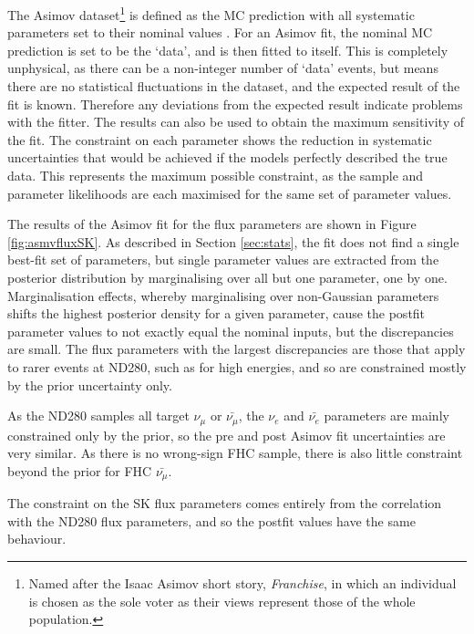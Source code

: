 The Asimov dataset\footnote{Named after the Isaac Asimov short story, \textit{Franchise}, in which an individual is chosen as the sole voter as their views represent those of the whole population.} is defined as the MC prediction with all systematic parameters set to their nominal values \cite{Cowan_2011}. For an Asimov fit, the nominal MC prediction is set to be the `data', and is then fitted to itself. This is completely unphysical, as there can be a non-integer number of `data' events, but means there are no statistical fluctuations in the dataset, and the expected result of the fit is known. Therefore any deviations from the expected result indicate problems with the fitter. The results can also be used to obtain the maximum sensitivity of the fit. The constraint on each parameter shows the reduction in systematic uncertainties that would be achieved if the models perfectly described the true data. This represents the maximum possible constraint, as the sample and parameter likelihoods are each maximised for the same set of parameter values.

The results of the Asimov fit for the flux parameters are shown in Figure \ref{fig:asmvfluxSK}. As described in Section \ref{sec:stats}, the fit does not find a single best-fit set of parameters, but single parameter values are extracted from the posterior distribution by marginalising over all but one parameter, one by one. Marginalisation effects, whereby marginalising over non-Gaussian parameters shifts the highest posterior density for a given parameter, cause the postfit parameter values to not exactly equal the nominal inputs, but the discrepancies are small. The flux parameters with the largest discrepancies are those that apply to rarer events at ND280, such as for high energies, and so are constrained mostly by the prior uncertainty only.

As the ND280 samples all target $\nu_{\mu}$ or $\bar{\nu_{\mu}}$, the $\nu_e$ and $\bar{\nu_e}$ parameters are mainly constrained only by the prior, so the pre and post Asimov fit uncertainties are very similar. As there is no wrong-sign FHC sample, there is also little constraint beyond the prior for FHC $\bar{\nu_{\mu}}$. 

The constraint on the SK flux parameters comes entirely from the correlation with the ND280 flux parameters, and so the postfit values have the same behaviour.

